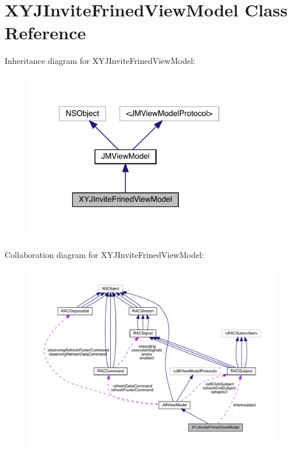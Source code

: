 \hypertarget{interface_x_y_j_invite_frined_view_model}{}\section{X\+Y\+J\+Invite\+Frined\+View\+Model Class Reference}
\label{interface_x_y_j_invite_frined_view_model}


Inheritance diagram for X\+Y\+J\+Invite\+Frined\+View\+Model\+:\nopagebreak
\begin{figure}[H]
\begin{center}
\leavevmode
\includegraphics[width=284pt]{interface_x_y_j_invite_frined_view_model__inherit__graph}
\end{center}
\end{figure}


Collaboration diagram for X\+Y\+J\+Invite\+Frined\+View\+Model\+:\nopagebreak
\begin{figure}[H]
\begin{center}
\leavevmode
\includegraphics[width=350pt]{interface_x_y_j_invite_frined_view_model__coll__graph}
\end{center}
\end{figure}

